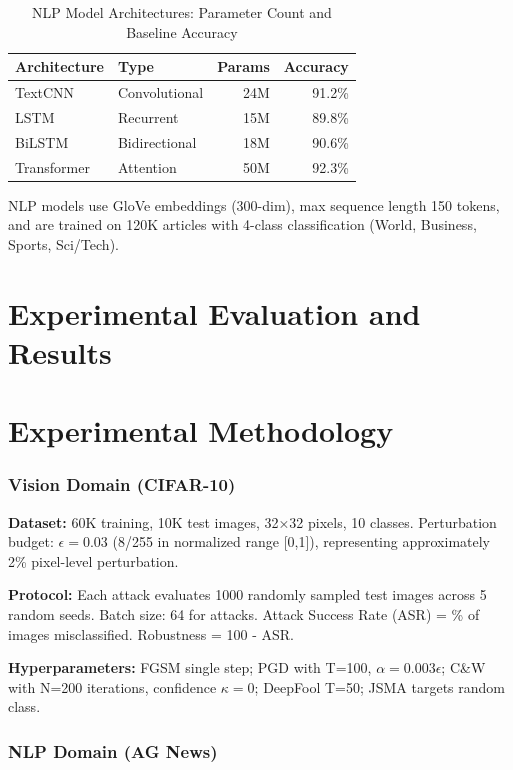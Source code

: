 \documentclass[10pt,conference]{IEEEtran}
\begin{document}
\begin{table}[t]
\centering
\caption{NLP Model Architectures: Parameter Count and Baseline Accuracy}
\begin{tabular}{llrr}
\toprule
\textbf{Architecture} & \textbf{Type} & \textbf{Params} & \textbf{Accuracy} \\
\midrule
TextCNN & Convolutional & 24M & 91.2\% \\
LSTM & Recurrent & 15M & 89.8\% \\
BiLSTM & Bidirectional & 18M & 90.6\% \\
Transformer & Attention & 50M & 92.3\% \\
\bottomrule
\end{tabular}
\end{table}

NLP models use GloVe embeddings (300-dim), max sequence length 150 tokens, and are trained on 120K articles with 4-class classification (World, Business, Sports, Sci/Tech).

\section{Experimental Evaluation and Results}

\section{Experimental Methodology}

\subsubsection{Vision Domain (CIFAR-10)}

\textbf{Dataset:} 60K training, 10K test images, 32×32 pixels, 10 classes. Perturbation budget: $\epsilon = 0.03$ (8/255 in normalized range [0,1]), representing approximately 2\% pixel-level perturbation.

\textbf{Protocol:} Each attack evaluates 1000 randomly sampled test images across 5 random seeds. Batch size: 64 for attacks. Attack Success Rate (ASR) = \% of images misclassified. Robustness = 100 - ASR.

\textbf{Hyperparameters:} FGSM single step; PGD with T=100, $\alpha=0.003 \epsilon$; C\&W with N=200 iterations, confidence $\kappa=0$; DeepFool T=50; JSMA targets random class.

\subsubsection{NLP Domain (AG News)}
\end{document}
